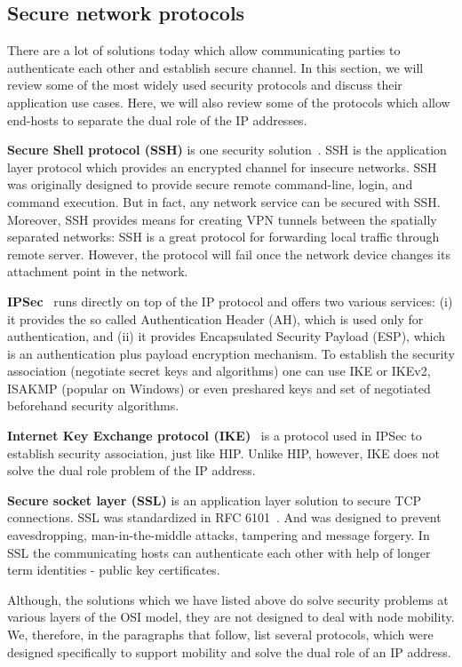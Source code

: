 \subsection{Secure network protocols}

There are a lot of solutions today which allow communicating parties 
to authenticate each other and establish secure channel. In this section,
we will review some of the most widely used security protocols and discuss
their application use cases. Here, we will also review some of the 
protocols which allow end-hosts to separate the dual role of the IP addresses.

{\bf Secure Shell protocol (SSH)} is one security solution~\cite{ssh}. SSH is
the application layer protocol which provides an encrypted channel for insecure
networks. SSH was originally designed to provide secure  
remote command-line, login, and command execution. But in fact, 
any network service can be secured with SSH. Moreover, SSH provides
means for creating VPN tunnels between the spatially separated networks:
SSH is a great protocol for forwarding local traffic through remote 
server. However, the protocol will fail once the network device changes its 
attachment point in the network. 

{\bf IPSec}~\cite{ipsec} runs directly on top of the IP protocol and offers two 
various services: (i) it provides the so called Authentication Header (AH),
which is used only for authentication, and 
(ii) it provides Encapsulated Security Payload (ESP), which is an authentication 
plus payload encryption mechanism. To establish the security association (negotiate
secret keys and algorithms) one can use IKE or IKEv2, ISAKMP (popular on Windows) or
even preshared keys and set of negotiated beforehand security algorithms. 

{\bf Internet Key Exchange protocol (IKE)}~\cite{rfc5996} is a protocol used in IPSec to establish
security association, just like HIP. Unlike HIP, however, IKE does not solve the 
dual role problem of the IP address.

{\bf Secure socket layer (SSL)} is an application layer solution to secure TCP 
connections. SSL was standardized in RFC 6101~\cite{rfc6101}. And was designed 
to prevent eavesdropping, man-in-the-middle attacks, tampering and message forgery.
In SSL the communicating hosts can authenticate each other with help of 
longer term identities - public key certificates.

Although, the solutions which we have listed above do solve security problems
at various layers of the OSI model, they are not designed to deal with node 
mobility. We, therefore, in the paragraphs that follow, list several protocols,
which were designed specifically to support mobility and solve the dual role of 
an IP address.

